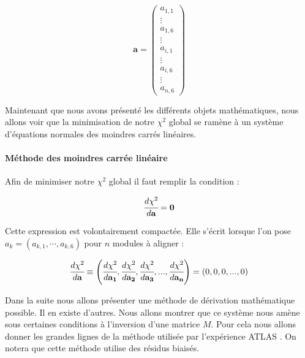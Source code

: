    \begin{equation}
    \mathbf{a} = \begin{pmatrix} a_{1,1} \\ \vdots \\ a_{1,6} \\ \vdots \\ a_{i,1} \\ \vdots \\ a_{i,6} \\ \vdots  \\ a_{n,6}  \end{pmatrix}
   \end{equation}
   
   Maintenant que nous avons pr\'esent\'e les diff\'erents objets math\'ematiques, nous allons voir que la minimisation de notre $\chi^2$ global se ram\`ene \`a un syst\`eme d'\'equations normales des moindres carr\'es lin\'eaires.
   
   \paragraph{M\'ethode des moindres carr\'ee lin\'eaire}
   
   Afin de minimiser notre $\chi^2$ global il faut remplir la condition :
   
   \begin{equation}
    \cfrac{d \chi^2}{d \mathbf{a}} = \mathbf{0}
    \label{eq:MiniChi2}
   \end{equation}

   Cette expression est volontairement compact\'ee. Elle s'\'ecrit lorsque l'on pose $a_k = (a_{k,1}, \cdots, a_{k,6})$ pour $n$ modules \`a aligner :
   
   \begin{equation}
    \cfrac{d\chi^2}{d\mathbf{a}} \equiv \left( \cfrac{d\chi^2}{d\mathbf{a_1}}, \cfrac{d\chi^2}{d\mathbf{a_2}}, \cfrac{d\chi^2}{d\mathbf{a_3}}, ..., \cfrac{d\chi^2}{d\mathbf{a_n}}\right) = (0, 0, 0, ..., 0)
   \end{equation}
   
   Dans la suite nous allons pr\'esenter une m\'ethode de d\'erivation math\'ematique possible. Il en existe d'autres. Nous allons montrer que ce syst\`eme nous am\`ene sous certaines conditions \`a l'inversion d'une matrice $M$. Pour cela nous allons donner les grandes lignes de la m\'ethode utilis\'ee par l'exp\'erience ATLAS \cite{Bruckman:2005uxa}. On notera que cette m\'ethode utilise des r\'esidus biais\'es.
   

